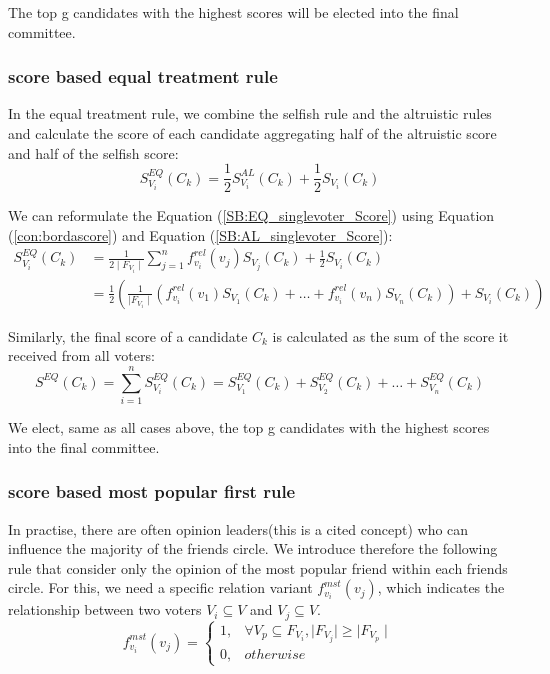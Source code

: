 \documentclass[
   a4paper,                      %
   tucfont,                      %
   english,                      %
   tuctitle,                     %
   intoc,                        %
   twoside,                      %
   captions=tableheading,        %
   openright,                    %
   final,                        %
   ]{tuc-thesis}                 %
\begin{document}
The top g candidates with the highest scores will be elected into the final committee.

\subsubsection{score based equal treatment rule}
In the equal treatment rule, we combine the selfish rule and the altruistic rules and calculate the score of each candidate aggregating half of the altruistic score and half of the selfish score:
\begin{equation}
S_{V_i}^{EQ}(C_k) = \frac{1}{2}S_{V_i}^{AL}(C_k) + \frac{1}{2}S_{V_i}(C_k)\label{SB:EQ_singlevoter_Score}
\end{equation}

We can reformulate the Equation (\ref{SB:EQ_singlevoter_Score}) using Equation (\ref{con:bordascore}) and Equation (\ref{SB:AL_singlevoter_Score}): 
\begin{equation}
\begin{split}
S_{V_i}^{EQ}(C_k) &= \frac{1}{2\mid F_{V_i}\mid}\sum_{j=1}^{n} f_{v_i}^{rel}(v_j)S_{V_j}(C_k)+  \frac{1}{2}S_{V_i}(C_k) \\
            &= \frac{1}{2}(\frac{1}{\mid F_{V_i}\mid}(f_{v_i}^{rel}(v_1)S_{V_1}(C_k) + \dots + f_{v_i}^{rel}(v_n)S_{V_n}(C_k)) + S_{V_i}(C_k))\label{SB:EQ_singlevoter_Score_reform}\end{split}
\end{equation}

Similarly, the final score of a candidate $C_k$ is calculated as the sum of the score it received from all voters:
\begin{equation}
S^{EQ}(C_k) = \sum_{i=1}^{n} S_{V_i}^{EQ}(C_k)= S_{V_1}^{EQ}(C_k) + S_{V_2}^{EQ}(C_k) + \dots + S_{V_n}^{EQ}(C_k)\label{SB:EQ_aggr_voter_Score}
\end{equation}

We elect, same as all cases above, the top g candidates with the highest scores into the final committee.

\subsubsection{score based most popular first rule}
In practise, there are often opinion leaders(this is a cited concept) who can influence the majority of the friends circle. We introduce therefore the following rule that consider only the opinion of the most popular friend within each friends circle.
For this, we need a specific relation variant $f_{v_i}^{mst}(v_j)$, which indicates the relationship between two voters $V_i\subseteq V$ and $V_j\subseteq V$. 
 \begin{equation}
 f_{v_i}^{mst}(v_j) =\begin{cases}
        1, &\forall  V_p \subseteq F_{V_i},   \mid F_{V_j} \mid \geqslant 
        \mid F_{V_p} \mid  \\
        0, &otherwise
        \end{cases}\label{re:MST}
\end{equation}
\end{document}
